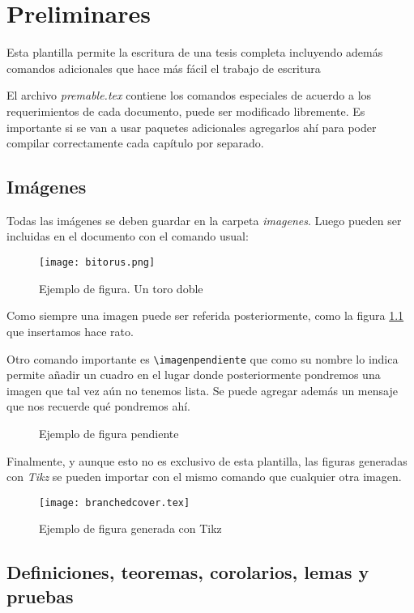 \documentclass[11pt, twoside]{book}
\begin{document}
\chapter{Preliminares}
Esta plantilla permite la escritura de una tesis completa incluyendo además
comandos adicionales que hace más fácil el trabajo de escritura

El archivo \textit{premable.tex} contiene los comandos especiales de acuerdo a
los requerimientos de cada documento, puede ser modificado libremente. Es
importante si se van a usar paquetes adicionales agregarlos ahí para poder
compilar correctamente cada capítulo por separado.

\section{Imágenes} \label{sec:imagenes}
Todas las imágenes se deben guardar en la carpeta \textit{imagenes}. Luego
pueden ser incluidas en el documento con el comando usual:

\begin{figure}[ht]
  \centering
  \texttt{[image: bitorus.png]}
  \caption{Ejemplo de figura. Un toro doble}
  \label{fig:dobletoro}
\end{figure}

Como siempre una imagen puede ser referida posteriormente, como la figura
\ref{fig:dobletoro} que insertamos hace rato.

Otro comando importante es \verb|\imagenpendiente| que como su nombre lo
indica permite añadir un cuadro en el lugar donde posteriormente pondremos una
imagen que tal vez aún no tenemos lista. Se puede agregar además un mensaje que
nos recuerde qué pondremos ahí.

\begin{figure}[ht]
  \centering
  \caption{Ejemplo de figura pendiente}
  \label{fig:pendiente1}
\end{figure}


Finalmente, y aunque esto no es exclusivo de esta plantilla, las figuras
generadas con \textit{Tikz} se pueden importar con el mismo comando que
cualquier otra imagen.

\begin{figure}[ht]
  \centering
  \texttt{[image: branchedcover.tex]}
  \caption{Ejemplo de figura generada con Tikz}
  \label{fig:tikz1}
\end{figure}


\section{Definiciones, teoremas, corolarios, lemas y pruebas}
\end{document}
